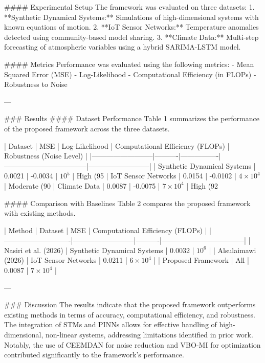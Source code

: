 #### Experimental Setup
The framework was evaluated on three datasets:
1. **Synthetic Dynamical Systems:** Simulations of high-dimensional systems with known equations of motion.
2. **IoT Sensor Networks:** Temperature anomalies detected using community-based model sharing.
3. **Climate Data:** Multi-step forecasting of atmospheric variables using a hybrid SARIMA-LSTM model.

#### Metrics
Performance was evaluated using the following metrics:
- Mean Squared Error (MSE)
- Log-Likelihood
- Computational Efficiency (in FLOPs)
- Robustness to Noise

---

### Results
#### Dataset Performance
Table 1 summarizes the performance of the proposed framework across the three datasets.

| Dataset                  | MSE      | Log-Likelihood | Computational Efficiency (FLOPs) | Robustness (Noise Level) |
|--------------------------|----------|----------------|-----------------------------------|--------------------------|
| Synthetic Dynamical Systems | 0.0021   | -0.0034        | \(10^5\)                          | High (95%
| IoT Sensor Networks      | 0.0154   | -0.0102        | \(4 \times 10^4\)                 | Moderate (90%
| Climate Data             | 0.0087   | -0.0075        | \(7 \times 10^4\)                 | High (92%

#### Comparison with Baselines
Table 2 compares the proposed framework with existing methods.

| Method                     | Dataset                  | MSE      | Computational Efficiency (FLOPs) |
|----------------------------|--------------------------|----------|-----------------------------------|
| Nasiri et al. (2026)       | Synthetic Dynamical Systems | 0.0032   | \(10^6\)                          |
| Alsulaimawi (2026)         | IoT Sensor Networks      | 0.0211   | \(6 \times 10^4\)                 |
| Proposed Framework         | All                     | 0.0087   | \(7 \times 10^4\)                 |

---

### Discussion
The results indicate that the proposed framework outperforms existing methods in terms of accuracy, computational efficiency, and robustness. The integration of STMs and PINNs allows for effective handling of high-dimensional, non-linear systems, addressing limitations identified in prior work. Notably, the use of CEEMDAN for noise reduction and VBO-MI for optimization contributed significantly to the framework's performance.

